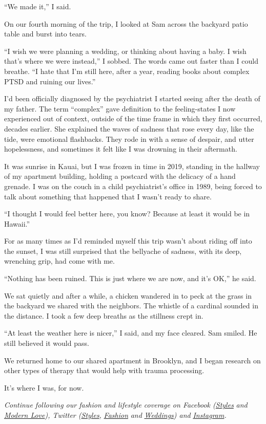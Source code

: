 ``We made it,'' I said.

On our fourth morning of the trip, I looked at Sam across the backyard
patio table and burst into tears.

``I wish we were planning a wedding, or thinking about having a baby. I
wish that's where we were instead,'' I sobbed. The words came out faster
than I could breathe. ``I hate that I'm still here, after a year,
reading books about complex PTSD and ruining our lives.''

I'd been officially diagnosed by the psychiatrist I started seeing after
the death of my father. The term ``complex'' gave definition to the
feeling-states I now experienced out of context, outside of the time
frame in which they first occurred, decades earlier. She explained the
waves of sadness that rose every day, like the tide, were emotional
flashbacks. They rode in with a sense of despair, and utter
hopelessness, and sometimes it felt like I was drowning in their
aftermath.

It was sunrise in Kauai, but I was frozen in time in 2019, standing in
the hallway of my apartment building, holding a postcard with the
delicacy of a hand grenade. I was on the couch in a child psychiatrist's
office in 1989, being forced to talk about something that happened that
I wasn't ready to share.

``I thought I would feel better here, you know? Because at least it
would be in Hawaii.''

For as many times as I'd reminded myself this trip wasn't about riding
off into the sunset, I was still surprised that the bellyache of
sadness, with its deep, wrenching grip, had come with me.

``Nothing has been ruined. This is just where we are now, and it's OK,''
he said.

We sat quietly and after a while, a chicken wandered in to peck at the
grass in the backyard we shared with the neighbors. The whistle of a
cardinal sounded in the distance. I took a few deep breaths as the
stillness crept in.

``At least the weather here is nicer,'' I said, and my face cleared. Sam
smiled. He still believed it would pass.

We returned home to our shared apartment in Brooklyn, and I began
research on other types of therapy that would help with trauma
processing.

It's where I was, for now.

\emph{Continue following our fashion and lifestyle coverage on Facebook
(}\href{https://www.facebookcorewwwi.onion/nytimesstyles}{\emph{Styles}}
\emph{and}
\href{https://www.facebookcorewwwi.onion/modernlove}{\emph{Modern
Love}}\emph{), Twitter
(}\href{https://twitter.com/nytstyles}{\emph{Styles}}\emph{,}
\href{https://twitter.com/nytfashion}{\emph{Fashion}} \emph{and}
\href{https://twitter.com/nytimesvows}{\emph{Weddings}}\emph{) and}
\href{https://instagram.com/nytimesfashion}{\emph{Instagram}}\emph{.}

